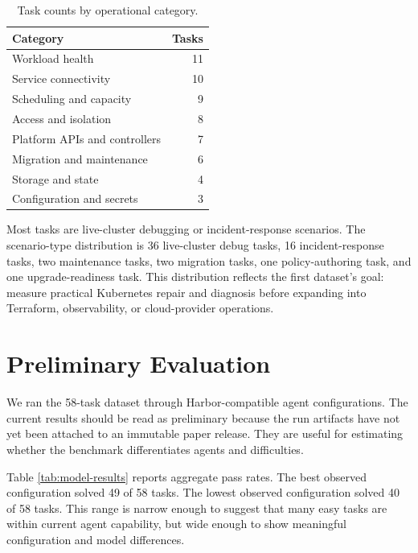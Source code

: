 \documentclass[11pt]{article}
\begin{document}
\begin{table}[h]
\centering
\begin{tabular}{lr}
\toprule
Category & Tasks \\
\midrule
Workload health & 11 \\
Service connectivity & 10 \\
Scheduling and capacity & 9 \\
Access and isolation & 8 \\
Platform APIs and controllers & 7 \\
Migration and maintenance & 6 \\
Storage and state & 4 \\
Configuration and secrets & 3 \\
\bottomrule
\end{tabular}
\caption{Task counts by operational category.}
\label{tab:dataset-category}
\end{table}

Most tasks are live-cluster debugging or incident-response scenarios. The
scenario-type distribution is 36 live-cluster debug tasks, 16 incident-response
tasks, two maintenance tasks, two migration tasks, one policy-authoring task,
and one upgrade-readiness task. This distribution reflects the first dataset's
goal: measure practical Kubernetes repair and diagnosis before expanding into
Terraform, observability, or cloud-provider operations.

\section{Preliminary Evaluation}

We ran the 58-task dataset through Harbor-compatible agent configurations. The
current results should be read as preliminary because the run artifacts have
not yet been attached to an immutable paper release. They are useful for
estimating whether the benchmark differentiates agents and difficulties.

Table \ref{tab:model-results} reports aggregate pass rates. The best observed
configuration solved 49 of 58 tasks. The lowest observed configuration solved
40 of 58 tasks. This range is narrow enough to suggest that many easy tasks are
within current agent capability, but wide enough to show meaningful
configuration and model differences.
\end{document}
